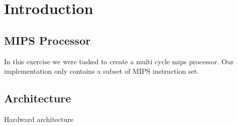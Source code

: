 \chapter{Introduction}

\section{MIPS Processor}
In this exercise we were tasked to create a multi cycle mips processor. Our implementation only contains a subset of MIPS instruction set.

\section{Architecture}
Hardward architecture
